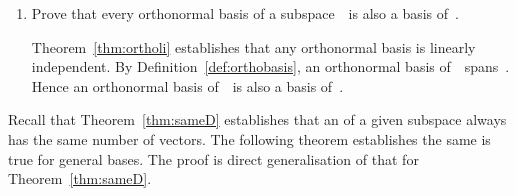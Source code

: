 \begin{example}
\begin{enumerate}
\item %
Prove that every orthonormal basis of a subspace~\WW\ is also a basis of~\WW.
\begin{solution} 
Theorem~\ref{thm:ortholi} establishes that any orthonormal basis is linearly independent.
By Definition~\ref{def:orthobasis}, an orthonormal basis of~\WW\ spans~\WW.
Hence an orthonormal basis of~\WW\ is also a basis of~\WW.
\end{solution}
\end{enumerate}
\end{example}


Recall that Theorem~\ref{thm:sameD} establishes that an  of a given subspace always has the same number of vectors.
The following theorem establishes the same is true for general bases.
The proof is direct generalisation of that for Theorem~\ref{thm:sameD}.

